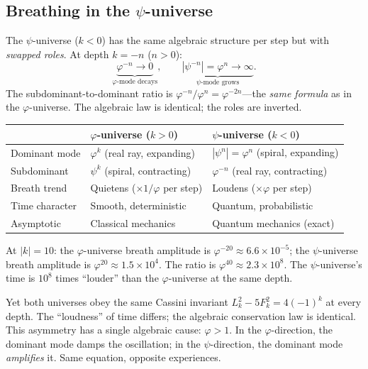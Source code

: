 \documentclass[12pt,a4paper]{article}
\begin{document}
\subsection{Breathing in the $\psi$-universe}
\label{sec:psi-breathing}

The $\psi$-universe ($k < 0$) has the same algebraic structure per step but with \emph{swapped roles}. At depth $k = -n$ ($n > 0$):
\begin{equation}
\underbrace{\varphi^{-n} \to 0}_{\text{$\varphi$-mode decays}}, \qquad \underbrace{|\psi^{-n}| = \varphi^n \to \infty}_{\text{$\psi$-mode grows}}.
\end{equation}
The subdominant-to-dominant ratio is $\varphi^{-n}/\varphi^n = \varphi^{-2n}$---the \emph{same formula} as in the $\varphi$-universe. The algebraic law is identical; the roles are inverted.

\begin{center}\small
\begin{tabular}{|l|p{3.6cm}|p{3.6cm}|}
\hline
 & \textbf{$\varphi$-universe} ($k>0$) & \textbf{$\psi$-universe} ($k<0$) \\
\hline
Dominant mode & $\varphi^k$ (real ray, expanding) & $|\psi^n|=\varphi^n$ (spiral, expanding) \\
Subdominant & $\psi^k$ (spiral, contracting) & $\varphi^{-n}$ (real ray, contracting) \\
Breath trend & Quietens ($\times 1/\varphi$ per step) & Loudens ($\times\varphi$ per step) \\
Time character & Smooth, deterministic & Quantum, probabilistic \\
Asymptotic & Classical mechanics & Quantum mechanics (exact) \\
\hline
\end{tabular}
\end{center}

At $|k| = 10$: the $\varphi$-universe breath amplitude is $\varphi^{-20} \approx 6.6 \times 10^{-5}$; the $\psi$-universe breath amplitude is $\varphi^{20} \approx 1.5 \times 10^4$. The ratio is $\varphi^{40} \approx 2.3 \times 10^8$. The $\psi$-universe's time is $10^8$ times ``louder'' than the $\varphi$-universe at the same depth.

Yet both universes obey the same Cassini invariant $L_k^2 - 5F_k^2 = 4(-1)^k$ at every depth. The ``loudness'' of time differs; the algebraic conservation law is identical. This asymmetry has a single algebraic cause: $\varphi > 1$. In the $\varphi$-direction, the dominant mode damps the oscillation; in the $\psi$-direction, the dominant mode \emph{amplifies} it. Same equation, opposite experiences.
\end{document}
